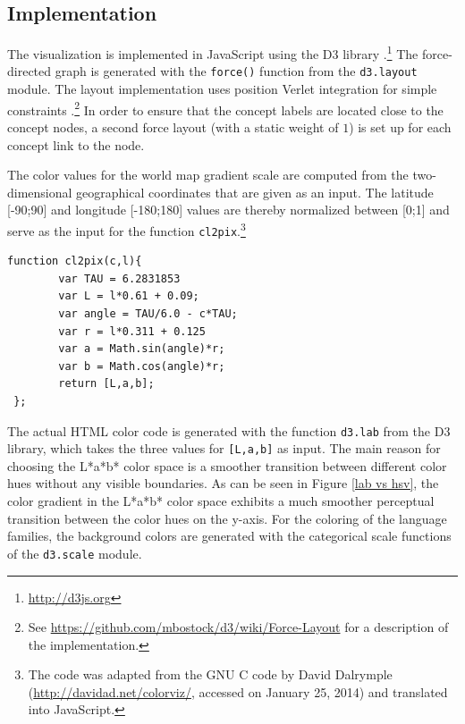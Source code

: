 


\subsection{Implementation}

The visualization is implemented in JavaScript using the D3 library \cite{D3}.\footnote{\url{http://d3js.org}} The force-directed graph is  generated with the \texttt{force()} function from the \texttt{d3.layout} module. The layout implementation uses position Verlet integration for simple constraints \cite{Dwyer2009}.\footnote{See \url{https://github.com/mbostock/d3/wiki/Force-Layout} for a description of the implementation.} In order to ensure that the concept labels are located close to the concept nodes, a second force layout (with a static weight of $1$) is set up for each concept link to the node. 

The color values for the world map gradient scale are computed from the two-dimensional geographical coordinates that are given as an input. The latitude [-90;90] and longitude [-180;180] values are thereby normalized between [0;1] and serve as the input for the function \texttt{cl2pix}.\footnote{The code was adapted from the GNU C code by David Dalrymple (\url{http://davidad.net/colorviz/}, accessed on January 25, 2014) and translated into JavaScript.}

\begin{verbatim}
function cl2pix(c,l){
   		var TAU = 6.2831853 
   		var L = l*0.61 + 0.09; 
   		var angle = TAU/6.0 - c*TAU;   
   		var r = l*0.311 + 0.125 
   		var a = Math.sin(angle)*r;
   		var b = Math.cos(angle)*r;
   		return [L,a,b];
 };
\end{verbatim}

The actual HTML color code is generated with the function \texttt{d3.lab} from the D3 library, which takes the three values for \texttt{[L,a,b]} as input. The main reason for choosing the L*a*b* color space is a smoother transition between different color hues without any visible boundaries. As can be seen in Figure \ref{lab vs hsv}, the color gradient in the L*a*b* color space exhibits a much smoother perceptual transition between the color hues on the y-axis. 
For the coloring of the language families, the background colors are generated with the categorical scale functions of the \texttt{d3.scale} module. 

